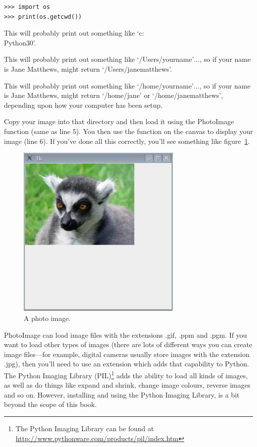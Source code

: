 \begin{Verbatim}[frame=single]
>>> import os
>>> print(os.getcwd())
\end{Verbatim}

\begin{WINDOWS}
This will probably print out something like `c:\\Python30'.
\end{WINDOWS}

\begin{MAC}
This will probably print out something like `/Users/yourname'$\ldots$, so if your name is Jane Matthews,  might return `/Users/janematthews'.
\end{MAC}

\begin{LINUX}
This will probably print out something like `/home/yourname'$\ldots$, so if your name is Jane Matthews,  might return `/home/jane' or `/home/janematthews', depending upon how your computer has been setup.
\end{LINUX}

Copy your image into that directory and then load it using the PhotoImage function (same as line 5). You then use the  function on the canvas to display your image (line 6). If you've done all this correctly, you'll see something like figure~\ref{fig43}.

\begin{figure}
\begin{center}
\includegraphics[width=80mm]{images/figure43}
\end{center}
\caption{A photo image.}\label{fig43}
\end{figure}

PhotoImage can load image files with the extensions .gif, .ppm and .pgm. If you want to load other types of images (there are lots of different ways you can create image files---for example, digital cameras usually store images with the extension .jpg), then you'll need to use an extension which adds that capability to Python. The Python Imaging Library (PIL)\footnote{The Python Imaging Library can be found at \href{http://www.pythonware.com/products/pil/index.htm}{http://www.pythonware.com/products/pil/index.htm}} adds the ability to load all kinds of images, as well as do things like expand and shrink, change image colours, reverse images and so on. However, installing and using the Python Imaging Library, is a bit beyond the scope of this book.

